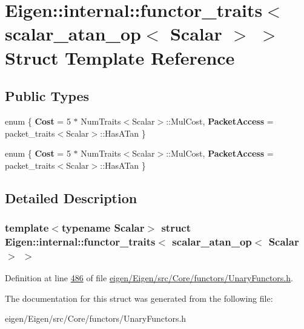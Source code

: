 \hypertarget{struct_eigen_1_1internal_1_1functor__traits_3_01scalar__atan__op_3_01_scalar_01_4_01_4}{}\section{Eigen\+:\+:internal\+:\+:functor\+\_\+traits$<$ scalar\+\_\+atan\+\_\+op$<$ Scalar $>$ $>$ Struct Template Reference}
\label{struct_eigen_1_1internal_1_1functor__traits_3_01scalar__atan__op_3_01_scalar_01_4_01_4}
\subsection*{Public Types}
\begin{DoxyCompactItemize}
\item 
\mbox{\label{struct_eigen_1_1internal_1_1functor__traits_3_01scalar__atan__op_3_01_scalar_01_4_01_4_ac8b160c243d4e590b098223aa4a56cf3}} 
enum \{ {\bfseries Cost} = 5 $\ast$ Num\+Traits$<$Scalar$>$\+:\+:Mul\+Cost, 
{\bfseries Packet\+Access} = packet\+\_\+traits$<$Scalar$>$\+:\+:Has\+A\+Tan
 \}
\item 
\mbox{\label{struct_eigen_1_1internal_1_1functor__traits_3_01scalar__atan__op_3_01_scalar_01_4_01_4_a53b6d5474b0833398e06bc01d130bd44}} 
enum \{ {\bfseries Cost} = 5 $\ast$ Num\+Traits$<$Scalar$>$\+:\+:Mul\+Cost, 
{\bfseries Packet\+Access} = packet\+\_\+traits$<$Scalar$>$\+:\+:Has\+A\+Tan
 \}
\end{DoxyCompactItemize}


\subsection{Detailed Description}
\subsubsection*{template$<$typename Scalar$>$\newline
struct Eigen\+::internal\+::functor\+\_\+traits$<$ scalar\+\_\+atan\+\_\+op$<$ Scalar $>$ $>$}



Definition at line \hyperlink{eigen_2_eigen_2src_2_core_2functors_2_unary_functors_8h_source_l00486}{486} of file \hyperlink{eigen_2_eigen_2src_2_core_2functors_2_unary_functors_8h_source}{eigen/\+Eigen/src/\+Core/functors/\+Unary\+Functors.\+h}.



The documentation for this struct was generated from the following file\+:\begin{DoxyCompactItemize}
\item 
eigen/\+Eigen/src/\+Core/functors/\+Unary\+Functors.\+h\end{DoxyCompactItemize}
